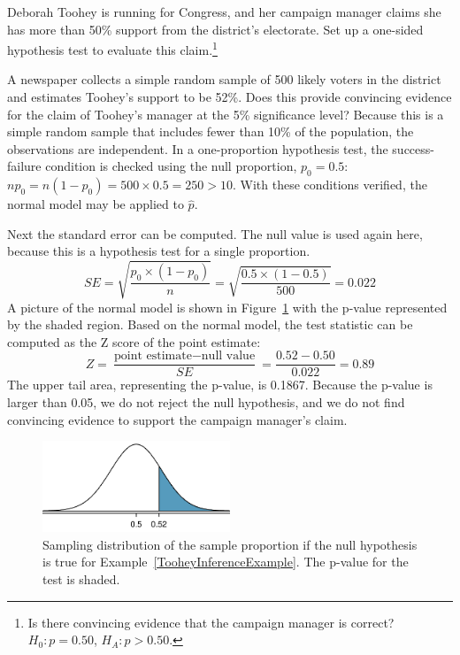 \begin{exercise}
Deborah Toohey is running for Congress, and her campaign manager claims she has more than 50\% support from the district's electorate. Set up a one-sided hypothesis test to evaluate this claim.\footnote{Is there convincing evidence that the campaign manager is correct? $H_0: p = 0.50$, $H_A: p > 0.50$.}
\end{exercise}

\begin{example}{A newspaper collects a simple random sample of 500 likely voters in the district and estimates Toohey's support to be 52\%. Does this provide convincing evidence for the claim of Toohey's manager at the 5\% significance level?} \label{TooheyInferenceExample}
Because this is a simple random sample that includes fewer than 10\% of the population, the observations are independent. In a one-proportion hypothesis test, the success-failure condition is checked using the null proportion, $p_0=0.5$: $np_0 = n(1-p_0) = 500\times 0.5 = 250 > 10$. With these conditions verified, the normal model may be applied to $\hat{p}$.

Next the standard error can be computed. The null value is used again here, because this is a hypothesis test for a single proportion.
$$SE = \sqrt{\frac{p_0\times (1-p_0)}{n}} = \sqrt{\frac{0.5\times (1-0.5)}{500}} = 0.022$$
A picture of the normal model is shown in Figure~\ref{pValueForCampaignManagerClaimOfMoreThan50PercentSupport} with the p-value represented by the shaded region. Based on the normal model, the test statistic can be computed as the Z score of the point estimate:
$$Z = \frac{\text{point estimate} - \text{null value}}{SE} = \frac{0.52 - 0.50}{0.022} = 0.89$$
The upper tail area, representing the p-value, is 0.1867. Because the p-value is larger than 0.05, we do not reject the null hypothesis, and we do not find convincing evidence to support the campaign manager's claim.
\end{example}

\begin{figure}[h]
\centering
\includegraphics[width=0.5\textwidth]{06/figures/pValueForCampaignManagerClaimOfMoreThan50PercentSupport/pValueForCampaignManagerClaimOfMoreThan50PercentSupport}
\caption{Sampling distribution of the sample proportion if the null hypothesis is true for Example~\ref{TooheyInferenceExample}. The p-value for the test is shaded.}
\label{pValueForCampaignManagerClaimOfMoreThan50PercentSupport}
\end{figure}

